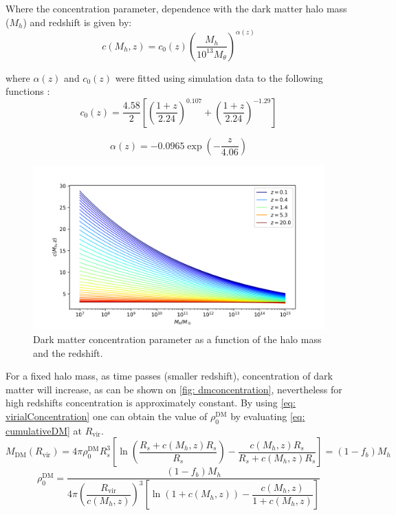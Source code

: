 		Where the concentration parameter, dependence with the dark matter halo mass ($M_h$) and redshift is given by: 
		\begin{equation}
			c(M_h, z) = c_0(z)\left(\dfrac{M_h}{10^{13}M_\theta}\right)^{\alpha(z)}
		\end{equation}
		
		where $\alpha(z)$ and $c_0(z)$ were fitted using simulation data to the following functions \cite{choksi2017recoiling}:
		\begin{equation}
			c_0(z) = \dfrac{4.58}{2}\left[\left(\dfrac{1 + z}{2.24}\right)^{0.107} + \left(\dfrac{1 + z}{2.24}\right)^{-1.29}\right]
		\end{equation}
		
		\begin{equation}
			\alpha(z) = -0.0965 \exp\left(-\dfrac{z}{4.06}\right)
		\end{equation}
	
		\begin{figure}[h]
			\centering
			\includegraphics[width=0.7\linewidth]{"../Files/Week 3/darkmatter_concentration"}
			\caption{Dark matter concentration parameter as a function of the halo mass and the redshift.}
			\label{fig: dmconcentration}
		\end{figure}
	
		For a fixed halo mass, as time passes (smaller redshift), concentration of dark matter will increase, as can be shown on \autoref{fig: dmconcentration}, nevertheless for high redshifts concentration is approximately constant. By using \autoref{eq: virialConcentration} one can obtain the value of $\rho_0^\text{DM}$ by evaluating \autoref{eq: cumulativeDM} at $R_\text{vir}$.
		\begin{equation}\label{eq: dmM_virial}
			M_\text{DM}(R_\text{vir}) = 4\pi\rho_0^\text{DM}R_s^3 \left[\ln\left(\dfrac{R_s + c(M_h, z)R_s}{R_s}\right) - \dfrac{c(M_h, z)R_s}{R_s + c(M_h, z)R_s}\right] = (1 - f_b)M_h
		\end{equation}
		\begin{equation}\label{eq: rho0dm}
			\rho_0^\text{DM} = \dfrac{(1 - f_b)M_h}{4\pi \left(\dfrac{R_\text{vir}}{c(M_h, z)}\right)^3 \left[\ln\left(1 + c(M_h, z)\right) - \dfrac{c(M_h, z)}{1 + c(M_h, z)}\right]}
		\end{equation}
	
